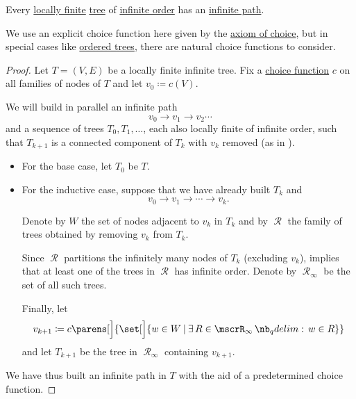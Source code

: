 \begin{lemma}\label{thm:konigs_infinity_lemma}
  Every \hyperref[def:graph_cardinality/local]{locally finite} \hyperref[def:tree]{tree} of \hyperref[def:graph_cardinality/order]{infinite order} has an \hyperref[def:graph_walk/path]{infinite path}.
\end{lemma}
\begin{comments}
  \item We use an explicit choice function here given by the \hyperref[def:zfc/choice]{axiom of choice}, but in special cases like \hyperref[def:ordered_tree]{ordered trees}, there are natural choice functions to consider.
\end{comments}
\begin{proof}
  Let \( T = (V, E) \) be a locally finite infinite tree. Fix a \hyperref[def:choice_function]{choice function} \( c \) on all families of nodes of \( T \) and let \( v_0 \coloneqq c(V) \).

  We will build in parallel an infinite path
  \begin{equation*}
    v_0 \to v_1 \to v_2 \cdots
  \end{equation*}
  and a sequence of trees \( T_0, T_1, \ldots \), each also locally finite of infinite order, such that \( T_{k+1} \) is a connected component of \( T_k \) with \( v_k \) removed (as in ).

  \begin{itemize}
    \item For the base case, let \( T_0 \) be \( T \).

    \item For the inductive case, suppose that we have already built \( T_k \) and
    \begin{equation*}
      v_0 \to v_1 \to \cdots \to v_k.
    \end{equation*}

    Denote by \( W \) the set of nodes adjacent to \( v_k \) in \( T_k \) and by \( \mscrR \) the family of trees obtained by removing \( v_k \) from \( T_k \).

    Since \( \mscrR \) partitions the infinitely many nodes of \( T_k \) (excluding \( v_k \)),  implies that at least one of the trees in \( \mscrR \) has infinite order. Denote by \( \mscrR_\infty \) be the set of all such trees.

    Finally, let
    \begin{equation*}
      v_{k+1} \coloneqq c\parens[\Big]{ \set[\Big]{ w \in W \given \qexists* {R \in \mscrR_\infty} w \in R } }
    \end{equation*}
    and let \( T_{k+1} \) be the tree in \( \mscrR_\infty \) containing \( v_{k+1} \).
  \end{itemize}

  We have thus built an infinite path in \( T \) with the aid of a predetermined choice function.
\end{proof}

